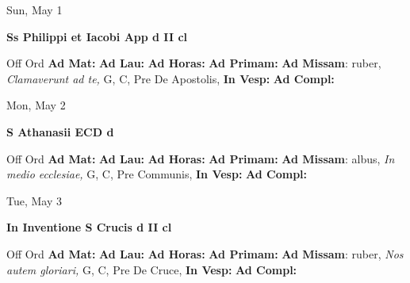 \documentclass[10pt]{book}
\begin{document}
\begin{center}
\begin{minipage}{3.5in}
\vspace{2em}
\begin{center}Sun, May 1
\end{center}
\textbf{ \large Ss Philippi et Iacobi App
\textnormal{\normalsize d II cl}}

\begin{justify}Off Ord
\textbf{Ad Mat: }
\textbf{Ad Lau: }
\textbf{Ad Horas: }
\textbf{Ad Primam: }\textbf{Ad Missam}: ruber, \textit{Clamaverunt ad te,} G, C, Pre De Apostolis, 
\textbf{In Vesp: }
\textbf{Ad Compl: }
\end{justify}
\end{minipage}
\end{center}

\begin{center}
\begin{minipage}{3.5in}
\vspace{2em}
\begin{center}Mon, May 2
\end{center}
\textbf{ \large S Athanasii ECD
\textnormal{\normalsize d}}

\begin{justify}Off Ord
\textbf{Ad Mat: }
\textbf{Ad Lau: }
\textbf{Ad Horas: }
\textbf{Ad Primam: }\textbf{Ad Missam}: albus, \textit{In medio ecclesiae,} G, C, Pre Communis, 
\textbf{In Vesp: }
\textbf{Ad Compl: }
\end{justify}
\end{minipage}
\end{center}

\begin{center}
\begin{minipage}{3.5in}
\vspace{2em}
\begin{center}Tue, May 3
\end{center}
\textbf{ \large In Inventione S Crucis
\textnormal{\normalsize d II cl}}

\begin{justify}Off Ord
\textbf{Ad Mat: }
\textbf{Ad Lau: }
\textbf{Ad Horas: }
\textbf{Ad Primam: }\textbf{Ad Missam}: ruber, \textit{Nos autem gloriari,} G, C, Pre De Cruce, 
\textbf{In Vesp: }
\textbf{Ad Compl: }
\end{justify}
\end{minipage}
\end{center}
\end{document}
